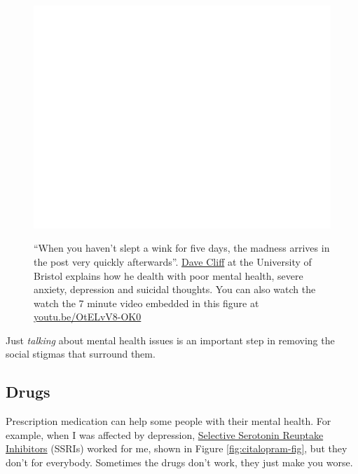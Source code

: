 \documentclass[
]{book}
\begin{document}
\begin{figure}

{\centering \href{https://www.youtube.com/embed/OtELvV8-OK0}{\includegraphics[width=0.99\linewidth]{cdyf_files/figure-latex/cliff-fig-1} }

}

\caption{``When you haven't slept a wink for five days, the madness arrives in the post very quickly afterwards''. \href{https://en.wikipedia.org/wiki/Dave_Cliff_(computer_scientist)}{Dave Cliff} at the University of Bristol explains how he dealth with poor mental health, severe anxiety, depression and suicidal thoughts. \citep{thecliff} You can also watch the watch the 7 minute video embedded in this figure at \href{https://youtu.be/OtELvV8-OK0}{youtu.be/OtELvV8-OK0} \citep{youtube-davecliff}}\label{fig:cliff-fig}
\end{figure}



Just \emph{talking} about mental health issues is an important step in removing the social stigmas that surround them.

\hypertarget{drugs}{%
\subsection{Drugs}\label{drugs}}

Prescription medication can help some people with their mental health. For example, when I was affected by depression, \href{https://www.nhs.uk/conditions/ssri-antidepressants/}{Selective Serotonin Reuptake Inhibitors} (SSRIs) worked for me, shown in Figure \ref{fig:citalopram-fig}, but they don't for everybody. Sometimes the drugs don't work, they just make you worse. \citep{drugsdontwork}
\end{document}
